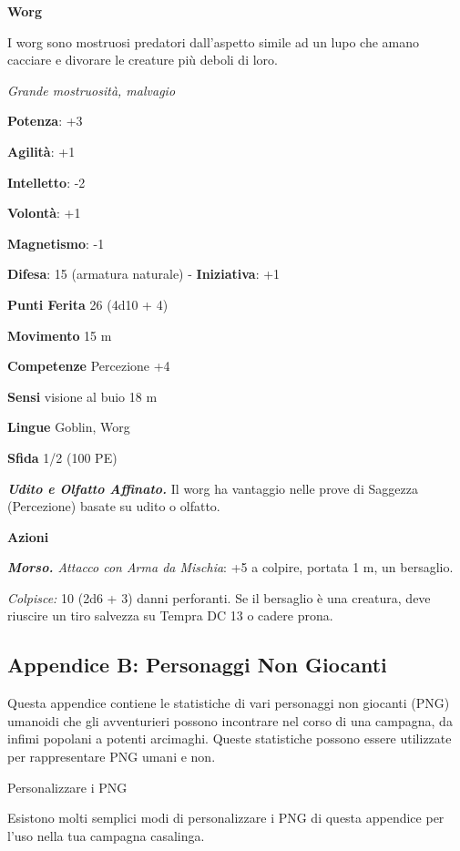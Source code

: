 \begin{multicols}{2}
\textbf{Worg}

I worg sono mostruosi predatori dall'aspetto simile ad un lupo che amano
cacciare e divorare le creature più deboli di loro.

\emph{Grande mostruosità, malvagio}

\textbf{Potenza}: +3

\textbf{Agilità}: +1

\textbf{Intelletto}: -2

\textbf{Volontà}: +1

\textbf{Magnetismo}: -1

\textbf{Difesa}: 15 (armatura naturale) - \textbf{Iniziativa}: +1

\textbf{Punti Ferita} 26 (4d10 + 4)

\textbf{Movimento} 15 m

\textbf{Competenze} Percezione +4

\textbf{Sensi} visione al buio 18 m

\textbf{Lingue} Goblin, Worg

\textbf{Sfida} 1/2 (100 PE)\smallskip

\emph{\textbf{Udito e Olfatto Affinato.}} Il worg ha vantaggio nelle
prove di Saggezza (Percezione) basate su udito o olfatto.

\smallskip\textbf{Azioni}

\emph{\textbf{Morso.} Attacco con Arma da Mischia}: +5 a colpire,
portata 1 m, un bersaglio.

\emph{Colpisce:} 10 (2d6 + 3) danni perforanti. Se il bersaglio è una
creatura, deve riuscire un tiro salvezza su Tempra DC 13 o cadere prona.

\pagebreak

\subsection{Appendice B: Personaggi Non Giocanti}

Questa appendice contiene le statistiche di vari personaggi non giocanti
(PNG) umanoidi che gli avventurieri possono incontrare nel corso di una
campagna, da infimi popolani a potenti arcimaghi. Queste statistiche
possono essere utilizzate per rappresentare PNG umani e non.

Personalizzare i PNG

Esistono molti semplici modi di personalizzare i PNG di questa appendice
per l'uso nella tua campagna casalinga.


\end{multicols}

